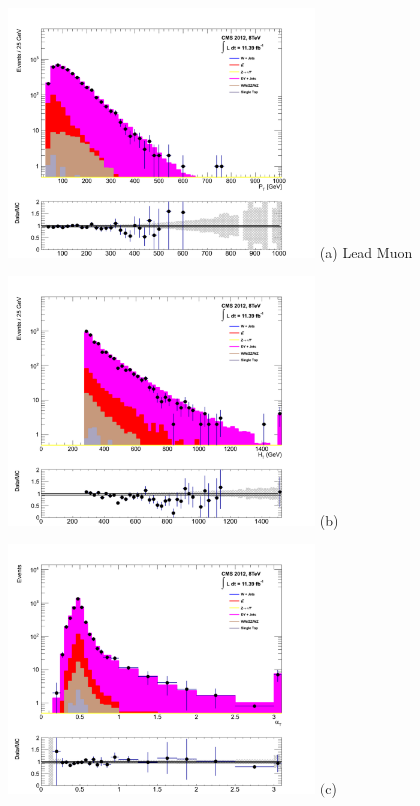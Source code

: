\begin{itemize}
\begin{figure}[ht]
\centering
\begin{minipage}{.48\textwidth}
\centering
\includegraphics[width = 3.2in]{plots/dimuon_leadmu_datamc.pdf}
(a) Lead Muon \pt
\end{minipage}
\begin{minipage}{.48\textwidth}
\centering
\includegraphics[width = 3.2in]{plots/dimuon_ht_datamc.pdf}
(b) \theht
\end{minipage}
\begin{minipage}{.48\textwidth}
\centering
\includegraphics[width = 3.2in]{plots/dimuon_alphat_datamc.pdf}
$\text{(c}$) \alphat
\end{minipage}

\end{figure}
\end{itemize}
